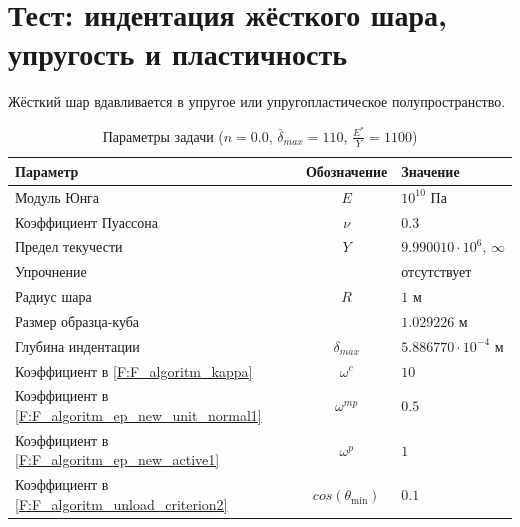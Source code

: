 \section{Тест: индентация жёсткого шара, упругость и пластичность}
\begin{table}[h!]
	Жёсткий шар вдавливается в упругое или упругопластическое полупространство.
	\caption{Параметры задачи (${n=0.0}$, ${\bar{\delta}_{max}=110}$, ${\frac{E^*}{Y}=1100}$)}
	
	\begin{tabular}{|p{5.3cm}|c|p{7cm}|}
		
		\hline
		Параметр & Обозначение & Значение \\
		\hline
		Модуль Юнга & $E$ & $10^{10}$ Па \\
		\hline
		Коэффициент Пуассона & $\nu$ & $0.3$ \\
		\hline
		Предел текучести & $Y$ & $9.990010\cdot 10^{6},\,\infty$    \\
		\hline
		Упрочнение&  & отсутствует \\
		\hline
		Радиус шара & $R$ & $1$ м \\
		\hline
		Размер образца-куба &  & $1.029226$ м\\
		\hline
		Глубина индентации&
		$\delta_{max}$
		& $5.886770\cdot 10^{-4}$ м  \\
		\hline
		Коэффициент в \eqref{F:F_algoritm_kappa} & $\omega^{c}$ & $10$ \\
		\hline
		Коэффициент в \eqref{F:F_algoritm_ep_new_unit_normal1} & $\omega^{mp}$ & $0.5$ \\
		\hline
		Коэффициент в \eqref{F:F_algoritm_ep_new_active1}& $\omega^{p}$ & $1$ \\
		\hline
		Коэффициент в \eqref{F:F_algoritm_unload_criterion2} & $cos\left(\theta_{\mathrm{min}}\right)$ & $0.1$ \\
		\hline
	\end{tabular}
	\label{tab:test1_parameters}
\end{table}

